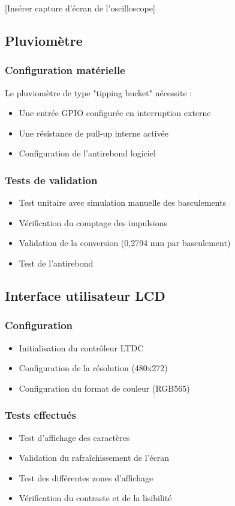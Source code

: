 \documentclass[12pt]{article}
\begin{document}
[Insérer capture d'écran de l'oscilloscope]

\subsection{Pluviomètre}
\subsubsection{Configuration matérielle}
Le pluviomètre de type "tipping bucket" nécessite :
\begin{itemize}
    \item Une entrée GPIO configurée en interruption externe
    \item Une résistance de pull-up interne activée
    \item Configuration de l'antirebond logiciel
\end{itemize}

\subsubsection{Tests de validation}
\begin{itemize}
    \item Test unitaire avec simulation manuelle des basculements
    \item Vérification du comptage des impulsions
    \item Validation de la conversion (0,2794 mm par basculement)
    \item Test de l'antirebond
\end{itemize}

\subsection{Interface utilisateur LCD}
\subsubsection{Configuration}
\begin{itemize}
    \item Initialisation du contrôleur LTDC
    \item Configuration de la résolution (480x272)
    \item Configuration du format de couleur (RGB565)
\end{itemize}

\subsubsection{Tests effectués}
\begin{itemize}
    \item Test d'affichage des caractères
    \item Validation du rafraîchissement de l'écran
    \item Test des différentes zones d'affichage
    \item Vérification du contraste et de la lisibilité
\end{itemize}
\end{document}
